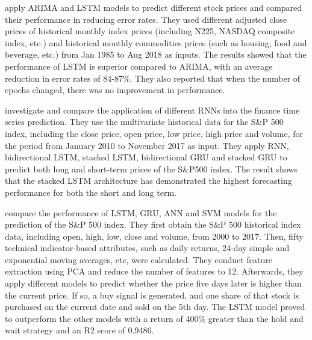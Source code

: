\documentclass{article}
\begin{document}
\cite{siami2018comparison} apply ARIMA and LSTM models to predict different stock prices and compared their performance in reducing error rates. They used different adjusted close prices of historical monthly index prices (including N225, NASDAQ composite index, etc.) and historical monthly commodities prices (such as housing, food and beverage, etc.) from Jan 1985 to Aug 2018 as inputs. The results showed that the performance of LSTM is superior compared to ARIMA, with an average reduction in error rates of 84-87\%. They also reported that when the number of epochs changed, there was no improvement in performance.

\cite{althelaya2018stock} investigate and compare the application of different RNNs into the finance time series prediction. They use the multivariate historical data for the S\&P 500 index, including the close price, open price, low price, high price and volume, for the period from January 2010 to November 2017 as input. They apply RNN, bidirectional LSTM, stacked LSTM, bidirectional GRU and stacked GRU to predict both long and short-term prices of the S\&P500 index. The result shows that the stacked LSTM architecture has demonstrated the highest forecasting performance for both the short and long term.

\cite{sethia2019application} compare the performance of LSTM, GRU, ANN and SVM models for the prediction of the S\&P 500 index. They first obtain the S\&P 500 historical index data, including open, high, low, close and volume, from 2000 to 2017. Then, fifty technical indicator-based attributes, such as daily returns, 24-day simple and exponential moving averages, etc, were calculated. They  conduct feature extraction using PCA and reduce the number of features to 12. Afterwards, they apply different models to predict whether the price five days later is higher than the current price. If so, a buy signal is generated, and one share of that stock is purchased on the current date and sold on the 5th day. The LSTM model proved to outperform the other models with a return of 400\% greater than the hold and wait strategy and an R2 score of 0.9486.
\end{document}
